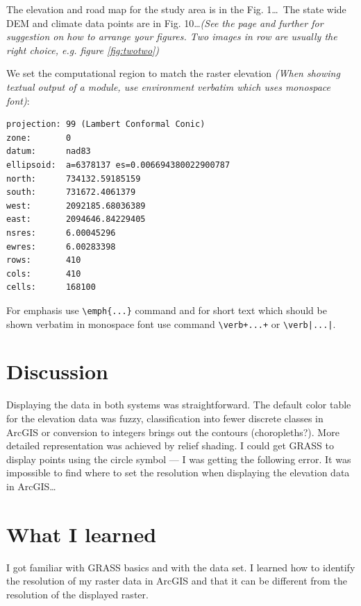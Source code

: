 \documentclass[10pt]{article}
\begin{document}
The elevation and road map for the study area is in the Fig. 1\ldots\ The state wide DEM
and climate data points are in Fig. 10\ldots \emph{(See the page \pageref{fig:figure-internal-label} and further
for suggestion on how to arrange your figures. Two images in row are usually the right choice,
e.g. figure \ref{fig:twotwo})}

We set the computational region to match the raster elevation
\emph{(When showing textual output of a module, use environment verbatim which uses monospace font)}:
\begin{verbatim}
projection: 99 (Lambert Conformal Conic)
zone:       0
datum:      nad83
ellipsoid:  a=6378137 es=0.006694380022900787
north:      734132.59185159
south:      731672.4061379
west:       2092185.68036389
east:       2094646.84229405
nsres:      6.00045296
ewres:      6.00283398
rows:       410
cols:       410
cells:      168100
\end{verbatim}
For emphasis use \verb|\emph{...}| command and for short text which should be shown
verbatim in monospace font use command \verb|\verb+...+| or \verb+\verb|...|+.


\section*{Discussion}

Displaying the data in both systems was straightforward. The default color table
for the elevation data was fuzzy, classification into fewer discrete classes
in ArcGIS or conversion to integers brings out the contours (choropleths?).
More detailed representation was achieved by relief shading.
I could get GRASS to display points using the circle symbol --- I was getting the following error.
It was impossible to find where to set the resolution when displaying the elevation data in ArcGIS\ldots


\section*{What I learned}

I got familiar with GRASS basics and with the data set.
I learned how to identify the resolution of my raster data in ArcGIS
and that it can be different from the resolution of the displayed raster.
\end{document}
